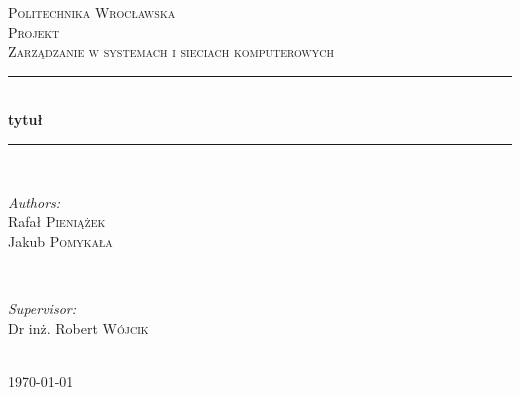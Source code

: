 \documentclass{article}
\begin{document}
	
	\begin{titlepage}
		\center
		\newcommand{\HRule}{\rule{\linewidth}{0.5mm}}
		
		\textsc{\LARGE Politechnika Wrocławska}\\[1.5cm]
		\textsc{\Large Projekt}\\[0.5cm] 
		\textsc{\large Zarządzanie w systemach i sieciach komputerowych}\\[0.5cm] 

		\HRule \\[0.4cm]
		{ \huge \bfseries tytuł}\\[0.4cm]
		\HRule \\[1.5cm]
		
		\begin{minipage}{0.4\textwidth}
			\begin{flushleft} \large
				\emph{Authors:}\\
				Rafał \textsc{Pieniążek} 
				\\ Jakub \textsc{Pomykała}
			\end{flushleft}
		\end{minipage}
		~
		\begin{minipage}{0.4\textwidth}
			\begin{flushright} \large
				\emph{Supervisor:} \\
				Dr inż. Robert \textsc{Wójcik} 
			\end{flushright}
		\end{minipage}\\[4cm]

		{\large \today}\\[3cm]
		
		\vfill
		
	\end{titlepage}

\tableofcontents
\newpage
\end{document}
